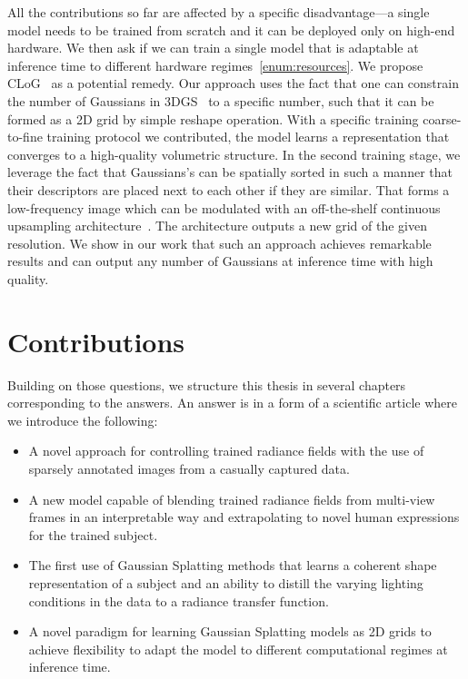   All the contributions so far are affected by a specific disadvantage---a
  single model needs to be trained from scratch and it can be deployed only on
  high-end hardware.
  We then ask if we can train a single model that is adaptable at inference
  time to different hardware regimes~\ref{enum:resources}.
  We propose CLoG~\cite{kania2024clog} as a potential remedy.
  Our approach uses the fact that one can constrain the number of Gaussians in
  3DGS~\cite{kerbl20233d} to a specific number, such that it can be formed as
  a 2D grid by simple reshape operation.
  With a specific training coarse-to-fine training protocol we contributed,
  the model learns a representation that converges to a high-quality
  volumetric structure.
  In the second training stage, we leverage the fact that Gaussians's can be
  spatially sorted in such a manner that their descriptors are placed next to
  each other if they are similar.
  That forms a low-frequency image which can be modulated with an
  off-the-shelf continuous upsampling architecture~\cite{vasconcelos2023cuf}.
  The architecture outputs a new grid of the given resolution.
  We show in our work that such an approach achieves remarkable results and
  can output any number of Gaussians at inference time with high quality.

\section{Contributions}
  Building on those questions, we structure this thesis in several chapters
  corresponding to the answers.
  An answer is in a form of a scientific article where we introduce the following:
  \begin{itemize}
    \item A novel approach for controlling trained radiance fields with the use of sparsely annotated images from a casually captured data.
    \item A new model capable of blending trained radiance fields from multi-view frames in an interpretable way and extrapolating to novel human expressions for the trained subject.
    \item The first use of Gaussian Splatting methods that learns a coherent shape representation of a subject and an ability to distill the varying lighting conditions in the data to a radiance transfer function.
    \item A novel paradigm for learning Gaussian Splatting models as 2D grids to achieve flexibility to adapt the model to different computational regimes at inference time.
  \end{itemize}

